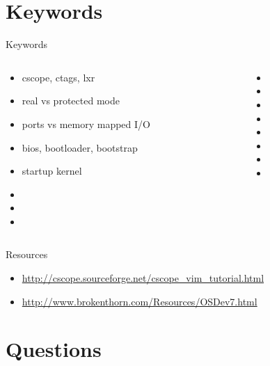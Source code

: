 \documentclass{workshop}
\begin{document}
\section{Keywords}

\begin{frame}{Keywords}
  \begin{columns}
    \begin{column}[l]{0.5\textwidth}
      \begin{itemize}
        \item cscope, ctags, lxr
        \item real vs protected mode
        \item ports vs memory mapped I/O
        \item bios, bootloader, bootstrap
        \item startup kernel
        \item 
        \item 
        \item 
      \end{itemize}
    \end{column}
    \begin{column}[l]{0.5\textwidth}
      \begin{itemize}
        \item 
        \item 
        \item 
        \item 
        \item 
        \item 
        \item 
        \item 
      \end{itemize}
    \end{column}
  \end{columns}
\end{frame}

\begin{frame}{Resources}
  \begin{itemize}
    \item \url{http://cscope.sourceforge.net/cscope_vim_tutorial.html}
    \item \url{http://www.brokenthorn.com/Resources/OSDev7.html}
  \end{itemize}
\end{frame}

\section{Questions}
\end{document}
